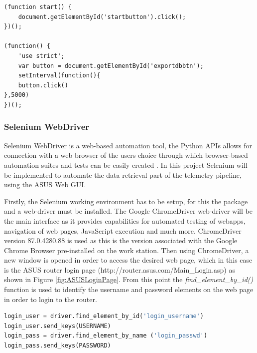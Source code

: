 \begin{lstlisting}[language=HTML, caption={Tampermonkey Data Collection Userscript Snippet}, label={lst:tampermonkey}]
(function start() {
    document.getElementById('startbutton').click();
})();

(function() {
    'use strict';
    var button = document.getElementById('exportdbbtn');
    setInterval(function(){
	button.click()
},5000)
})();
\end{lstlisting}




\subsubsection{Selenium WebDriver}

Selenium WebDriver is a web-based automation tool, the Python APIs allows for connection with a web browser of the users choice through which browser-based automation suites and tests can be easily created \cite{selenium}. In this project Selenium will be implemented to automate the data retrieval part of the telemetry pipeline, using the ASUS Web GUI. 

Firstly, the Selenium working environment has to be setup, for this the package and a web-driver must be installed. The Google ChromeDriver web-driver will be the main interface as it provides capabilities for automated testing of webapps, navigation of web pages, JavaScript execution and much more. ChromeDriver version 87.0.4280.88 is used as this is the version associated with the Google Chrome Browser pre-installed on the work station. Then using ChromeDriver, a new window is opened in order to access the desired web page, which in this case is the ASUS router login page (http://router.asus.com/Main\_Login.asp) as shown in Figure \ref{fig:ASUSLoginPage}. From this point the \textit{find\_element\_by\_id()} function is used to identify the username and password elements on the web page in order to login to the router. 

\begin{lstlisting}[language=Python, caption={ASUS Router Login Code Snippet (Selenium)}, label={lst:selenium}]
login_user = driver.find_element_by_id('login_username')
login_user.send_keys(USERNAME)
login_pass = driver.find_element_by_name ('login_passwd')
login_pass.send_keys(PASSWORD)
\end{lstlisting}

